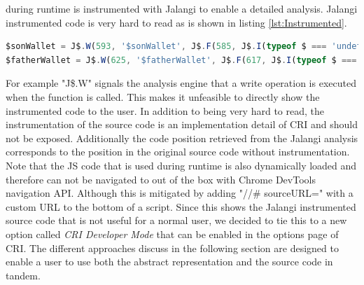 during runtime is instrumented with Jalangi to enable a detailed analysis. Jalangi instrumented code is very hard to read as is shown in listing \ref{lst:Instrumented}.

\begin{lstlisting}[language=JavaScript, caption={Example of RxJS code.},label={lst:Instrumented}]
$sonWallet = J$.W(593, '$sonWallet', J$.F(585, J$.I(typeof $ === 'undefined' ? $ = J$.R(569, '$', undefined, true, true) : $ = J$.R(569, '$', $, true, true)), false)(J$.T(577, '#wallet-son', 21, false)), J$.I(typeof $sonWallet === 'undefined' ? undefined : $sonWallet), true, true);
$fatherWallet = J$.W(625, '$fatherWallet', J$.F(617, J$.I(typeof $ === 'undefined' ? $ = J$.R(601, '$', undefined, true, true) : $ = J$.R(601, '$', $, true, true)), false)(J$.T(609, '#wallet-father', 21, false)), J$.I(typeof $fatherWallet === 'undefined' ? undefined : $fatherWallet), true, true);
\end{lstlisting}

For example "J\$.W" signals the analysis engine that a write operation is executed when the function is called. This makes it unfeasible to directly show the instrumented code to the user. In addition to being very hard to read, the instrumentation of the source code is an implementation detail of CRI and should not be exposed. Additionally the code position retrieved from the Jalangi analysis corresponds to the position in the original source code without instrumentation. Note that the JS code that is used during runtime is also dynamically loaded and therefore can not be navigated to out of the box with Chrome DevTools navigation API. Although this is mitigated by adding "//\# sourceURL=" with a custom URL to the bottom of a script. Since this shows the Jalangi instrumented source code that is not useful for a normal user, we decided to tie this to a new option called \emph{CRI Developer Mode} that can be enabled in the options page of CRI. The different approaches discuss in the following section are designed to enable a user to use both the abstract representation and the source code in tandem.
	

